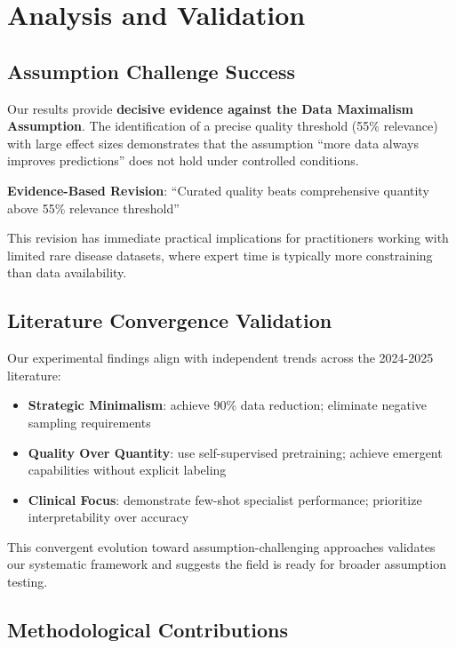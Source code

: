 \documentclass{article}
\begin{document}
\section{Analysis and Validation}

\subsection{Assumption Challenge Success}

Our results provide \textbf{decisive evidence against the Data Maximalism Assumption}. The identification of a precise quality threshold (55\% relevance) with large effect sizes demonstrates that the assumption ``more data always improves predictions'' does not hold under controlled conditions.

\textbf{Evidence-Based Revision}: ``Curated quality beats comprehensive quantity above 55\% relevance threshold''

This revision has immediate practical implications for practitioners working with limited rare disease datasets, where expert time is typically more constraining than data availability.

\subsection{Literature Convergence Validation}

Our experimental findings align with independent trends across the 2024-2025 literature:

\begin{itemize}
    \item \textbf{Strategic Minimalism}: \citet{kpaths_2025} achieve 90\% data reduction; \citet{drugclip_2024} eliminate negative sampling requirements
    \item \textbf{Quality Over Quantity}: \citet{videomol_2024} use self-supervised pretraining; \citet{omnibioTE_2024} achieve emergent capabilities without explicit labeling
    \item \textbf{Clinical Focus}: \citet{rarebench_2024} demonstrate few-shot specialist performance; \citet{kg_explainable_rare_2024} prioritize interpretability over accuracy
\end{itemize}

This convergent evolution toward assumption-challenging approaches validates our systematic framework and suggests the field is ready for broader assumption testing.

\subsection{Methodological Contributions}
\end{document}
